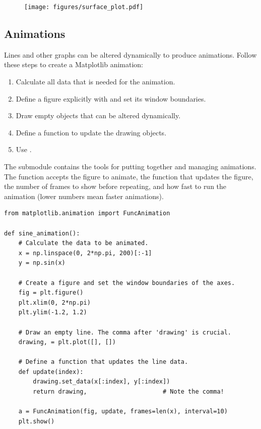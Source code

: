 \begin{figure}[H]
    \texttt{[image: figures/surface\_plot.pdf]}
\end{figure}

\subsection*{Animations} %

Lines and other graphs can be altered dynamically to produce animations.
Follow these steps to create a Matplotlib animation:
%
\begin{enumerate}
    \item Calculate all data that is needed for the animation.
    \item Define a figure explicitly with  and set its window boundaries.
    \item Draw empty objects that can be altered dynamically.
    \item Define a function to update the drawing objects.
    \item Use .
\end{enumerate}

The submodule  contains the tools for putting together and managing animations.
The function  accepts the figure to animate, the function that updates the figure, the number of frames to show before repeating, and how fast to run the animation (lower numbers mean faster animations).

\begin{lstlisting}
from matplotlib.animation import FuncAnimation

def sine_animation():
    # Calculate the data to be animated.
    x = np.linspace(0, 2*np.pi, 200)[:-1]
    y = np.sin(x)

    # Create a figure and set the window boundaries of the axes.
    fig = plt.figure()
    plt.xlim(0, 2*np.pi)
    plt.ylim(-1.2, 1.2)

    # Draw an empty line. The comma after 'drawing' is crucial.
    drawing, = plt.plot([], [])

    # Define a function that updates the line data.
    def update(index):
        drawing.set_data(x[:index], y[:index])
        return drawing,                     # Note the comma!

    a = FuncAnimation(fig, update, frames=len(x), interval=10)
    plt.show()
\end{lstlisting}

